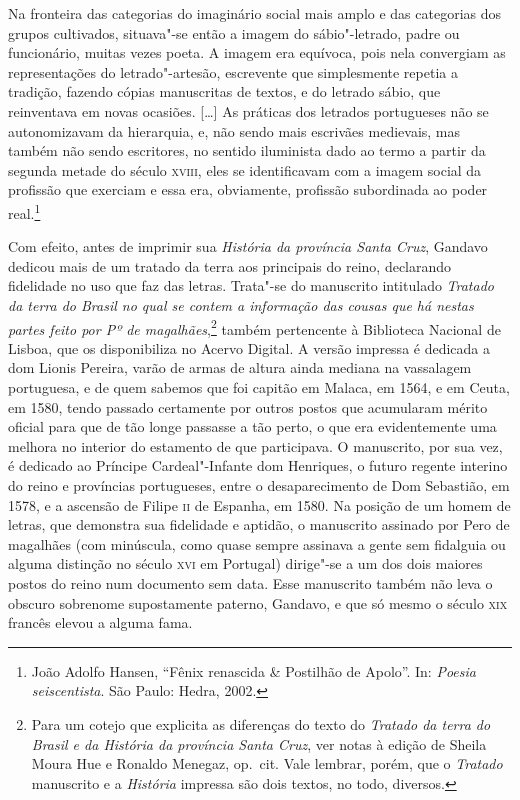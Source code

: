\begin{hedraquote}
Na fronteira das categorias do imaginário social mais amplo e das
categorias dos grupos cultivados, situava"-se então a imagem do
sábio"-letrado, padre ou funcionário, muitas vezes poeta. A imagem era
equívoca, pois nela convergiam as representações do letrado"-artesão,
escrevente que simplesmente repetia a tradição, fazendo cópias
manuscritas de textos, e do letrado sábio, que reinventava em novas
ocasiões. [\ldots{}] As práticas dos letrados portugueses não se
autonomizavam da hierarquia, e, não sendo mais escrivães medievais, mas
também não sendo escritores, no sentido iluminista dado ao termo a
partir da segunda metade do século \textsc{xviii}, eles se identificavam com a
imagem social da profissão que exerciam e essa era, obviamente,
profissão subordinada ao poder real.\footnote{ João Adolfo Hansen,
``Fênix renascida \& Postilhão de Apolo''. In: \textit{Poesia seiscentista}. São Paulo: Hedra, 2002.} 
\end{hedraquote}

Com efeito, antes de imprimir sua \textit{História da província Santa Cruz},
Gandavo dedicou mais de um tratado da terra aos principais do reino,
declarando fidelidade no uso que faz das letras. Trata"-se do manuscrito
intitulado \textit{Tratado da terra do Brasil no qual se contem a informação
das cousas que há nestas partes feito por Pº de magalhães},\footnote{ Para 
um cotejo que explicita as diferenças do texto
do \textit{Tratado da terra do Brasil e da História da província Santa Cruz},
ver notas à edição de Sheila Moura Hue e Ronaldo Menegaz, op.~cit. Vale
lembrar, porém, que o \textit{Tratado} manuscrito e a \textit{História} impressa são
dois textos, no todo, diversos.} também pertencente à Biblioteca
Nacional de Lisboa, que os disponibiliza no Acervo Digital. A versão
impressa é dedicada a dom Lionis Pereira, varão de armas de altura
ainda mediana na vassalagem portuguesa, e de quem sabemos que foi
capitão em Malaca, em 1564, e em Ceuta, em 1580, tendo passado
certamente por outros postos que acumularam mérito oficial para que de
tão longe passasse a tão perto, o que era evidentemente uma melhora no
interior do estamento de que participava. O manuscrito, por sua vez, é
dedicado ao Príncipe Cardeal"-Infante dom Henriques, o futuro regente
interino do reino e províncias portugueses, entre o desaparecimento de
Dom Sebastião, em 1578, e a ascensão de Filipe \textsc{ii} de Espanha, em 1580.
Na posição de um homem de letras, que demonstra sua fidelidade e
aptidão, o manuscrito assinado por Pero de magalhães (com minúscula,
como quase sempre assinava a gente sem fidalguia ou alguma distinção no
século \textsc{xvi} em Portugal) dirige"-se a um dos dois maiores postos do reino
num documento sem data. Esse manuscrito também não leva o obscuro
sobrenome supostamente paterno, Gandavo, e que só mesmo o século \textsc{xix}
francês elevou a alguma fama.

